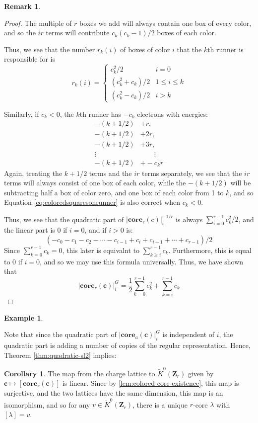 \documentclass{amsart}[12pt]
\theoremstyle{definition}
\newtheorem{example}[dummy]{Example}
\newtheorem{corollary}[dummy]{Corollary}
\newtheorem{remark}[dummy]{Remark}
\newcommand{\Z}{\mathbf{Z}}
\newcommand{\core}{\mathbf{core}}
\begin{document}
\begin{remark}
\begin{proof}
The multiple of $r$ boxes we add will always contain one box of every color, and so the $ir$ terms will contribute $c_k(c_k-1)/2$ boxes of each color.

Thus, we see that the number $r_k(i)$ of boxes of color $i$ that the $k$th runner is responsible for is
\begin{equation} \label{eq:coloredsquaresonrunner}
r_k(i)=  \left\{\begin{array}{ll}c_k^2/2 & i=0 \\  (c_k^2+c_k)/2 & 1 \leq i \leq k \\ (c_k^2-c_k)/2 & i>k \end{array}\right.\end{equation}

Similarly, if $c_k<0$, the $k$th runner has $-c_k$ electrons with energies:
\begin{align*}
-(k+1/2)&+r,\\
-(k+1/2)&+2r, \\
-(k+1/2)&+3r,\\
\vdots\quad &\qquad \vdots \\
-(k+1/2)&+-c_kr
\end{align*}
Again, treating the $k+1/2$ terms and the $ir$ terms separately, we see that the $ir$ terms will always consist of one box of each color, while the $-(k+1/2)$ will be subtracting half a box of color zero, and one box of each color from 1 to $k$, and so Equation \eqref{eq:coloredsquaresonrunner} is also correct when $c_k<0$.

Thus, we see that the quadratic part of $|\core_r(c)|_i^{-1/r}$ is always $\sum_{i=0}^{r-1} c_k^2/2$, and the linear part is 0 if $i=0$, and if $i>0$ is:
$$(-c_0-c_1-c_2-\cdots - c_{i-1}+c_i+c_{i+1}+\cdots+c_{r-1})/2$$
Since $\sum_{k=0}^{r-1} c_k=0$, this later is equivalnt to $\sum_{k\geq i}^{r-1} c_k$.  Furthermore, this is equal to 0 if $i=0$, and so we may use this formula universally.  Thus, we have shown that
$$|\core_r(\mathbf{c})|^G_i=\frac{1}{2}\sum_{k=0}^{r-1} c_k^2+ \sum^{r-1}_{k=i}c_k$$

\end{proof}

\begin{example}

\end{example}



Note that since the quadratic part of $|\core_a(\mathbf{c})|^G_i$ is independent of $i$, the quadratic part is adding a number of copies of the regular representation.  Hence, Theorem \ref{thm:quadratic-sl2} implies:
\begin{corollary} 
The map from the charge lattice to $\widetilde{K}^0(\Z_r)$ given by $\mathbf{c}\mapsto [\core_r(\mathbf{c})]$ is linear.  Since by \ref{lem:colored-core-existence}, this map is surjective, and the two lattices have the same dimension, this map is an isomorphism, and so for any $v\in \widetilde{K}^0(\Z_r)$, there is a unique $r$-core $\lambda$ with $[\lambda]=v$.
\end{corollary}


\end{remark}
\end{document}
